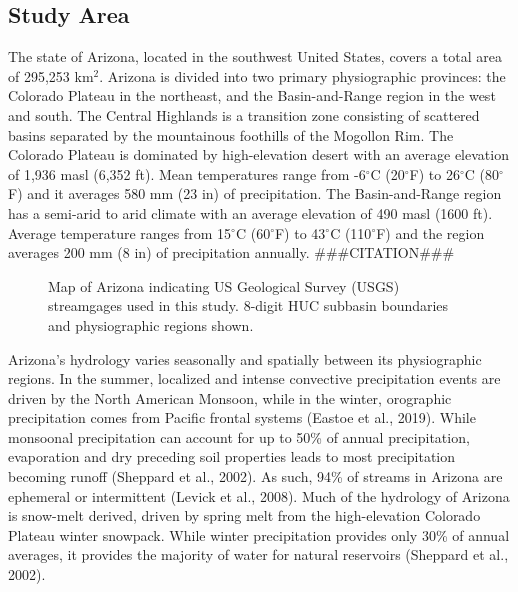 \documentclass[
]{agujournal2019}
\begin{document}
\subsection{Study Area}\label{sec-study-area}

The state of Arizona, located in the southwest United States, covers a
total area of 295,253 km\(^2\). Arizona is divided into two primary
physiographic provinces: the Colorado Plateau in the northeast, and the
Basin-and-Range region in the west and south. The Central Highlands is a
transition zone consisting of scattered basins separated by the
mountainous foothills of the Mogollon Rim. The Colorado Plateau is
dominated by high-elevation desert with an average elevation of 1,936
masl (6,352 ft). Mean temperatures range from -6\(^\circ\)C
(20\(^\circ\)F) to 26\(^\circ\)C (80\(^\circ\)F) and it averages 580 mm
(23 in) of precipitation. The Basin-and-Range region has a semi-arid to
arid climate with an average elevation of 490 masl (1600 ft). Average
temperature ranges from 15\(^\circ\)C (60\(^\circ\)F) to 43\(^\circ\)C
(110\(^\circ\)F) and the region averages 200 mm (8 in) of precipitation
annually. \#\#\#CITATION\#\#\#

\begin{figure}


\caption{\label{fig-study-area}Map of Arizona indicating US Geological
Survey (USGS) streamgages used in this study. 8-digit HUC subbasin
boundaries and physiographic regions shown.}

\end{figure}%

Arizona's hydrology varies seasonally and spatially between its
physiographic regions. In the summer, localized and intense convective
precipitation events are driven by the North American Monsoon, while in
the winter, orographic precipitation comes from Pacific frontal systems
(Eastoe et al., 2019). While monsoonal precipitation can account for up
to 50\% of annual precipitation, evaporation and dry preceding soil
properties leads to most precipitation becoming runoff (Sheppard et al.,
2002). As such, 94\% of streams in Arizona are ephemeral or intermittent
(Levick et al., 2008). Much of the hydrology of Arizona is snow-melt
derived, driven by spring melt from the high-elevation Colorado Plateau
winter snowpack. While winter precipitation provides only 30\% of annual
averages, it provides the majority of water for natural reservoirs
(Sheppard et al., 2002).
\end{document}
